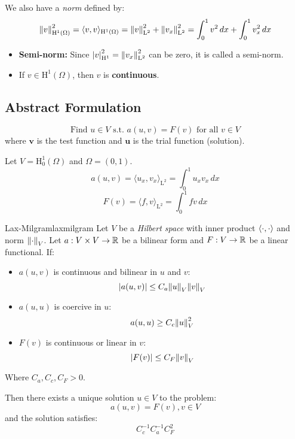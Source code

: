 We also have a \emph{norm} defined by:
\[
  \norm*{v}_{\mathrm{H}^1(\Omega)}^2 = \langle v, v \rangle_{\mathrm{H}^1(\Omega)} = \norm*{v}_{\mathrm{L}^2}^2 + \norm*{v_x}_{\mathrm{L}^2}^2 = \int_0^1 v^2 \,dx + \int_0^1 v_x^2 \,dx
\]

\begin{itemize}
  \item \textbf{Semi-norm:} Since \(\abs*{v}_{\mathrm{H}^1}^2 = \norm*{v_x }_{\mathrm{L}^2}^2\) can be zero, it is called a semi-norm.
  \item If \(v\in \mathrm{H}^1(\Omega)\), then \(v\) is \textbf{continuous}.
\end{itemize}

\subsection{Abstract Formulation}
\[
\boxed{\text{Find }u\in V\text{ s.t. }a(u,v) = F(v)\text{ for all }v\in V}
\]
where \(\symbf{v}\) is the test function and \(\symbf{u}\) is the trial function (solution).

Let \(V = \mathrm{H}^1_0 (\Omega)\) and \(\Omega = (0,1)\).
\[
a(u,v) = \langle u_x, v_x \rangle_{\mathrm{L}^2} = \int_0^1 u_x v_x \,dx
\]
\[
F(v) = \langle f, v \rangle_{\mathrm{L}^2} = \int_0^1 f v \,dx
\]
\begin{theorem}{Lax-Milgram}{laxmilgram}
  Let \(V\) be a \emph{Hilbert space} with inner product \(\inner{\cdot, \cdot}\) and norm \(\norm*{\cdot}_V\). Let \(a: V\times V\to \R\) be a bilinear form and \(F: V\to \R\) be a linear functional. If:
  \begin{itemize}
    \item \(a(u,v)\) is continuous and bilinear in \(u\) and \(v\):
          \[
            |a(u,v)| \leq C_a \norm*{u}_V\norm*{v}_V
          \]
    \item \(a(u,u)\) is coercive in \(u\):
          \[
            a(u,u) \geq C_c\norm*{u}_V^2
          \]
    \item \(F(v)\) is continuous or linear in \(v\):
          \[
            |F(v)| \leq C_F\norm*{v}_V
          \]
  \end{itemize}
  Where \(C_a, C_c, C_F > 0\).
  
  \medskip

  Then there exists a unique solution \(u\in V\) to the problem:
  \[
    a(u,v) = F(v), v\in V
  \]
  and the solution satisfies:
  \[
    C_c^{-1}C_a^{-1}C_F^2
  \]
\end{theorem}


